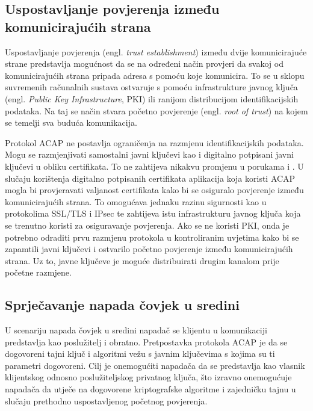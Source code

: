 \subsection{Uspostavljanje povjerenja između komunicirajućih strana}
Uspostavljanje povjerenja (engl. \emph{trust establishment}) između dvije
komunicirajuće strane predstavlja mogućnost da se na određeni način provjeri da
svakoj od komunicirajućih strana pripada adresa s pomoću koje komunicira. To
se u sklopu suvremenih računalnih sustava ostvaruje s pomoću infrastrukture
javnog ključa (engl. \emph{Public Key Infrastructure}, PKI) ili ranijom
distribucijom identifikacijskih podataka. Na taj se način stvara početno
povjerenje (engl. \emph{root of trust}) na kojem se temelji sva buduća
komunikacija.

Protokol ACAP
ne postavlja ograničenja na razmjenu identifikacijskih podataka. Mogu se
razmjenjivati samostalni javni ključevi kao i digitalno potpisani javni ključevi
u obliku certifikata. To ne zahtijeva nikakvu promjenu u porukama \initr{} i
\listi{}. U slučaju korištenja digitalno potpisanih certifikata aplikacija koja
koristi ACAP mogla bi provjeravati valjanost certifikata kako bi se osiguralo
povjerenje između komunicirajućih strana. To omogućava jednaku razinu sigurnosti
kao u protokolima SSL/TLS i IPsec te zahtijeva istu infrastrukturu javnog
ključa koja se trenutno koristi za
osiguravanje povjerenja. Ako se ne koristi PKI, onda je potrebno
odraditi prvu razmjenu protokola u kontroliranim uvjetima kako bi se zapamtili
javni ključevi i ostvarilo početno povjerenje između komunicirajućih strana. Uz
to, javne ključeve je moguće distribuirati drugim kanalom prije početne
razmjene.

\subsection{Sprječavanje napada čovjek u sredini}
U scenariju napada čovjek u
sredini napadač se klijentu u komunikaciji predstavlja kao poslužitelj i
obratno. Pretpostavka protokola ACAP je da se dogovoreni tajni ključ i algoritmi
vežu s javnim ključevima s kojima su ti parametri dogovoreni. Cilj je
onemogućiti napadača da se predstavlja kao vlasnik klijentskog odnosno
poslužiteljskog privatnog ključa, što izravno onemogućuje napadača da utječe na
dogovorene kriptografske algoritme i zajedničku tajnu u slučaju prethodno
uspostavljenog početnog povjerenja.


